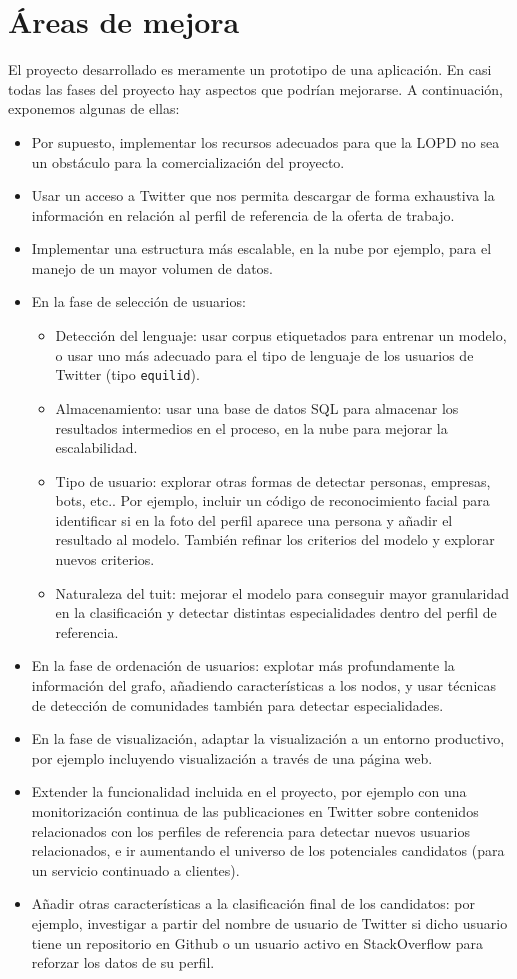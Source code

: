 \chapter{\'Areas de mejora}

El proyecto desarrollado es meramente un prototipo de una aplicación.
En casi todas las fases del proyecto hay aspectos que podrían
mejorarse. A continuación, exponemos algunas de ellas:
\begin{itemize} 
\item Por supuesto, implementar los recursos adecuados para que la 
LOPD no sea un obstáculo para la comercialización del proyecto.
\item Usar un acceso a Twitter que nos permita descargar de forma exhaustiva
la información en relación al perfil de referencia de la oferta de trabajo.
\item Implementar una estructura más escalable, en la nube por ejemplo,
para el manejo de un mayor volumen de datos.
\item En la fase de selección de usuarios:
\begin{itemize}
\item Detección del lenguaje: usar corpus etiquetados para entrenar un modelo,
o usar uno más adecuado para el tipo de lenguaje de los usuarios de Twitter 
(tipo {\tt equilid}).
\item Almacenamiento: usar una base de datos SQL para almacenar los resultados 
intermedios en el proceso, en la nube para mejorar la escalabilidad.
\item Tipo de usuario: explorar otras formas de detectar personas, empresas, bots, etc.. Por ejemplo,
incluir un código de reconocimiento facial para identificar si en la foto del perfil aparece una
persona y añadir el resultado al modelo. También refinar los criterios del modelo y explorar
nuevos criterios.
\item Naturaleza del tuit: mejorar el modelo para conseguir mayor granularidad en
la clasificación y detectar distintas especialidades dentro del perfil de referencia.
\end{itemize} 
\item En la fase de ordenación de usuarios: explotar más profundamente la información
del grafo, añadiendo características a los nodos, y usar técnicas de detección de comunidades
también para detectar especialidades.
\item En la fase de visualización, adaptar la visualización a un entorno productivo,
por ejemplo incluyendo visualización a través de una página web.
\item Extender la funcionalidad incluida en el proyecto, por ejemplo con una monitorización
continua de las publicaciones en Twitter sobre contenidos relacionados con los perfiles de 
referencia para detectar nuevos usuarios relacionados, e ir aumentando el universo de los 
potenciales candidatos (para un servicio continuado a clientes).
\item Añadir otras características a la clasificación final de los candidatos: por ejemplo,
investigar a partir del nombre de usuario de Twitter si dicho usuario tiene un repositorio en 
Github o un usuario activo en StackOverflow para reforzar los datos de su perfil.
\end{itemize} 